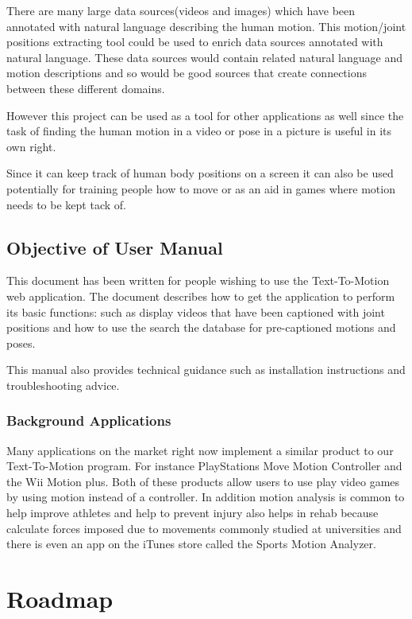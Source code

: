 \documentclass{scrreprt}
\begin{document}
There are many large data sources(videos and images) which have been annotated
with natural language describing the human motion. This motion/joint positions
extracting tool could be used to enrich data sources annotated with natural
language.  These data sources would contain related natural language  and
motion descriptions and so would be good sources that create connections
between these different domains.

However this project can be used as a tool for other applications as well since
the task of finding the human motion in a video or pose in a picture is useful
in its own right.

Since it can keep track of human body positions on a screen it can also be used
potentially for training people how to move or as an aid in games where motion
needs to be kept tack of.

\subsection{Objective of User Manual}

This document has been written for people wishing to use the Text-To-Motion web
application.  The document describes how to get the application to perform its
basic functions: such as display videos that have been captioned with joint
positions and how to use the search the database for pre-captioned motions and
poses.

This manual also provides technical guidance such as installation instructions
and troubleshooting advice.

\subsubsection{Background Applications}

Many applications on the market right now implement a similar product to our
Text-To-Motion program.  For instance PlayStations Move Motion Controller and
the Wii Motion plus.  Both of these products allow users to use play video
games by using motion instead of a controller.  In addition motion analysis is
common to help improve athletes and help to prevent injury also helps in rehab
because calculate forces imposed due to movements commonly studied at
universities and there is even an app on the iTunes store called the Sports
Motion Analyzer.

\section{Roadmap}
\end{document}
